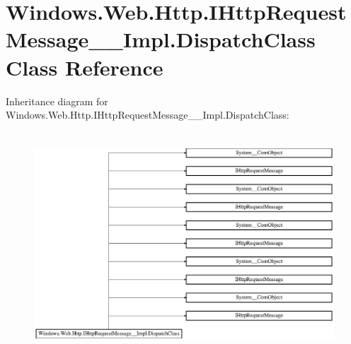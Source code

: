 \hypertarget{class_windows_1_1_web_1_1_http_1_1_i_http_request_message_____impl_1_1_dispatch_class}{}\section{Windows.\+Web.\+Http.\+I\+Http\+Request\+Message\+\_\+\+\_\+\+Impl.\+Dispatch\+Class Class Reference}
\label{class_windows_1_1_web_1_1_http_1_1_i_http_request_message_____impl_1_1_dispatch_class}
Inheritance diagram for Windows.\+Web.\+Http.\+I\+Http\+Request\+Message\+\_\+\+\_\+\+Impl.\+Dispatch\+Class\+:\begin{figure}[H]
\begin{center}
\leavevmode
\includegraphics[height=8.346883cm]{class_windows_1_1_web_1_1_http_1_1_i_http_request_message_____impl_1_1_dispatch_class}
\end{center}
\end{figure}
